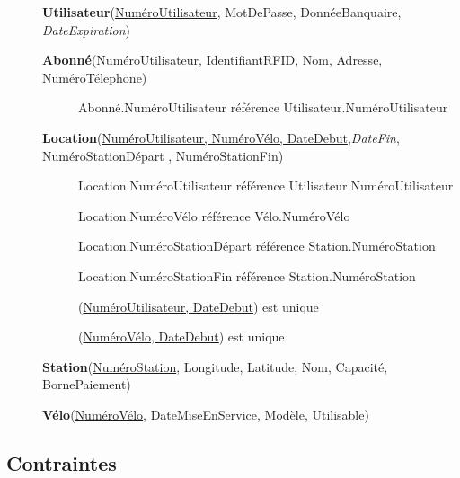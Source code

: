 \documentclass[a4paper,10pt]{article}
\begin{document}
\begin{description}
\item[] \textbf{Utilisateur}(\underline{NuméroUtilisateur}, MotDePasse, DonnéeBanquaire, \textit{DateExpiration})

\item[] \textbf{Abonné}(\underline{NuméroUtilisateur}, IdentifiantRFID, Nom, Adresse, NuméroTélephone)
	\begin{description}
	\item[] Abonné.NuméroUtilisateur référence Utilisateur.NuméroUtilisateur
	\end{description}

\item[] \textbf{Location}(\underline{NuméroUtilisateur, NuméroVélo, DateDebut},\textit{DateFin}, NuméroStationDépart , NuméroStationFin) %
	\begin{description}
	\item[] Location.NuméroUtilisateur référence Utilisateur.NuméroUtilisateur
	\item[] Location.NuméroVélo référence Vélo.NuméroVélo
	\item[] Location.NuméroStationDépart référence Station.NuméroStation
	\item[] Location.NuméroStationFin référence Station.NuméroStation
	\item[] (\underline{NuméroUtilisateur, DateDebut}) est unique
	\item[] (\underline{NuméroVélo, DateDebut}) est unique
	\end{description}
	
\item[] \textbf{Station}(\underline{NuméroStation}, Longitude, Latitude, Nom, Capacité, BornePaiement)

\item[] \textbf{Vélo}(\underline{NuméroVélo}, DateMiseEnService, Modèle, Utilisable)

\end{description}

\subsection{Contraintes}
\end{document}
